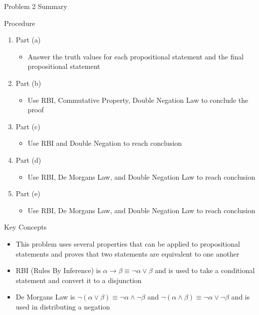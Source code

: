 \begin{summary}{Problem 2 Summary}
    \begin{statement}{Procedure}
        \begin{enumerate}[label = (\alph*)]
            \item Part (a)
            \begin{itemize}
                \item Answer the truth values for each propositional statement and the final propositional statement
            \end{itemize}
            \item Part (b)
            \begin{itemize}
                \item Use RBI, Commutative Property, Double Negation Law to conclude the proof
            \end{itemize}
            \item Part (c)
            \begin{itemize}
                \item Use RBI and Double Negation to reach conclusion
            \end{itemize}
            \item Part (d)
            \begin{itemize}
                \item Use RBI, De Morgans Law, and Double Negation Law to reach conclusion
            \end{itemize}
            \item Part (e)
            \begin{itemize}
                \item Use RBI, De Morgans Law, and Double Negation Law to reach conclusion
            \end{itemize}
        \end{enumerate}
    \end{statement}
    \begin{statement}{Key Concepts}
        \begin{itemize}
            \item This problem uses several properties that can be applied to propositional statements and proves that two statements are equivalent to one another
            \item RBI (Rules By Inference) is $\alpha \rightarrow \beta \equiv \neg \alpha \vee \beta$ and is used to take a conditional statement and convert it to a disjunction
            \item De Morgans Law is $\neg (\alpha \vee \beta) \equiv \neg \alpha \wedge \neg \beta$ and $\neg (\alpha \wedge \beta) \equiv \neg \alpha \vee \neg \beta$ and is used in distributing a negation

\end{itemize}
\end{statement}
\end{summary}
